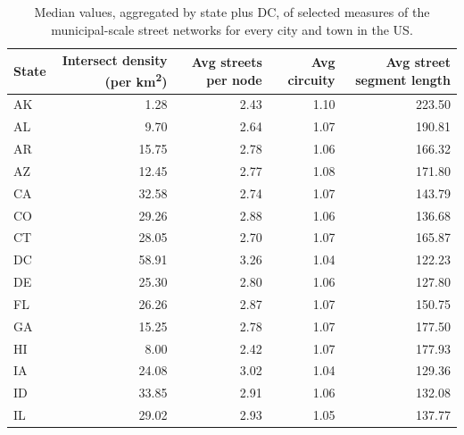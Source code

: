 \documentclass[11pt]{article}
\begin{document}
\begin{multicols}{2}
\begin{table}[htbp]
\centering
\caption{Median values, aggregated by state plus DC, of selected measures of the municipal-scale street networks for every city and town in the US.}
\label{tab:medians_state_aggregate}
\footnotesize
\begin{tabular}{ l r r r r }
	\toprule
	State & Intersect density (per km\textsuperscript{2}) & Avg streets per node & Avg circuity & Avg street segment length \\
	\midrule
	AK    &  1.28                       & 2.43                 & 1.10         & 223.50                    \\
	AL    &  9.70                       & 2.64                 & 1.07         & 190.81                    \\
	AR    & 15.75                       & 2.78                 & 1.06         & 166.32                    \\
	AZ    & 12.45                       & 2.77                 & 1.08         & 171.80                    \\
	CA    & 32.58                       & 2.74                 & 1.07         & 143.79                    \\
	CO    & 29.26                       & 2.88                 & 1.06         & 136.68                    \\
	CT    & 28.05                       & 2.70                 & 1.07         & 165.87                    \\
	DC    & 58.91                       & 3.26                 & 1.04         & 122.23                    \\
	DE    & 25.30                       & 2.80                 & 1.06         & 127.80                    \\
	FL    & 26.26                       & 2.87                 & 1.07         & 150.75                    \\
	GA    & 15.25                       & 2.78                 & 1.07         & 177.50                    \\
	HI    &  8.00                       & 2.42                 & 1.07         & 177.93                    \\
	IA    & 24.08                       & 3.02                 & 1.04         & 129.36                    \\
	ID    & 33.85                       & 2.91                 & 1.06         & 132.08                    \\
	IL    & 29.02                       & 2.93                 & 1.05         & 137.77                    \\

\end{tabular}
\end{table}
\end{multicols}
\end{document}
